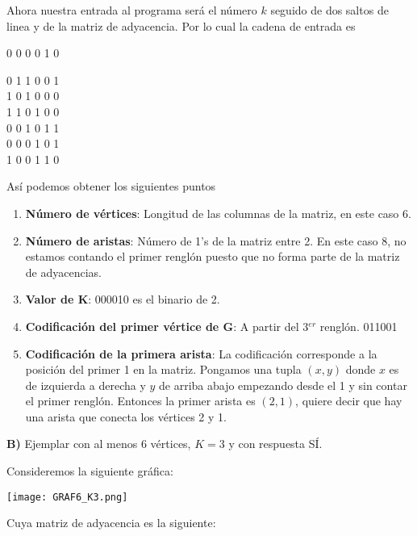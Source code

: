 \documentclass[12pt,letterpaper]{article}
\begin{document}
Ahora nuestra entrada al programa será el número $k$ seguido de dos saltos de linea y de la matriz de adyacencia. Por lo cual la cadena de entrada es
\begin{center}
0 0 0 0 1 0



0 1 1 0 0 1\\
1 0 1 0 0 0\\
1 1 0 1 0 0\\
0 0 1 0 1 1\\
0 0 0 1 0 1\\
1 0 0 1 1 0\\
\end{center}
\newpage
Así podemos obtener los siguientes puntos

\begin{enumerate}
    \item \textbf{Número de vértices}: Longitud de las columnas de la matriz, en este caso 6.
    
    \item \textbf{Número de aristas}: Número de 1's de la matriz entre 2. En este caso 8, no estamos contando el primer renglón puesto que no forma parte de la matriz de adyacencias.
    
    \item \textbf{Valor de K}: 000010 es el binario de 2.
    
    \item \textbf{Codificación del primer vértice de G}: A partir del 3$^{er}$ renglón. 011001
    
    \item \textbf{Codificación de la primera arista}: La codificación corresponde a la posición del primer 1 en la matriz. Pongamos una tupla $(x,y)$ donde $x$ es de izquierda a derecha y $y$ de arriba abajo empezando desde el 1 y sin contar el primer renglón. Entonces la primer arista es $(2,1)$, quiere decir que hay una arista que conecta los vértices 2 y 1.
\end{enumerate}

\textbf{B)} Ejemplar con al menos 6 vértices, $K = 3$ y con respuesta SÍ.

Consideremos la siguiente gráfica:

\begin{center}
    \texttt{[image: GRAF6\_K3.png]}
\end{center}

Cuya matriz de adyacencia es la siguiente: 
\end{document}

